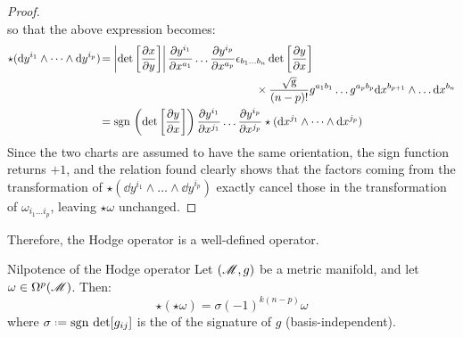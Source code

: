 \begin{proofbox}
\begin{proof}
\begin{equation}
      \label{eq:matrix-identity}
    \end{equation}
    so that the above expression becomes:
    \begin{equation*}
      \begin{split}
        \star (\mathrm{d} y^{i_1} \wedge \dots \wedge \mathrm{d} y^{i_p}) \hspace{-0.15em}
        & = \left\lvert\det \left[ \frac{\partial x}{\partial y} \right]\right\rvert \frac{\partial y^{i_1}}{\partial x^{a_1}} \dots \frac{\partial y^{i_p}}{\partial x^{a_p}} \epsilon_{b_1 \dots b_n} \det \left[ \frac{\partial y}{\partial x} \right] \\
        & \qquad \qquad \qquad \qquad \qquad \qquad \qquad \times \frac{\sqrt{\mathrm{g}}}{(n-p)!} g^{a_1 b_1} \dots g^{a_p b_p} \mathrm{d} x^{b_{p+1}} \wedge \dots \mathrm{d} x^{b_n} \\
        & = \mathrm{sgn}\,\left( \det \left[ \frac{\partial y}{\partial x} \right] \right) \frac{\partial y^{i_1}}{\partial x^{j_1}} \dots \frac{\partial y^{i_p}}{\partial x^{j_p}} \star (\mathrm{d} x^{j_1} \wedge \dots \wedge \mathrm{d} x^{j_p})
      \end{split}
    \end{equation*}
    Since the two charts are assumed to have the same orientation, the sign function returns $ +1 $, and the relation found clearly shows that the factors coming from the transformation of $ \star (\dd y^{i_1} \wedge \dots \wedge \dd y^{i_p}) $ exactly cancel those in the transformation of $ \omega_{i_1 \dots i_p} $, leaving $ \star \omega $ unchanged.
  \end{proof}
\end{proofbox}

Therefore, the Hodge operator is a well-defined operator.

\begin{lemma}{Nilpotence of the Hodge operator}{}
  Let $ (\mathscr{M},g) $ be a metric manifold, and let $ \omega \in \Omega^{p}(\mathscr{M}) $. Then:
  \begin{equation}
    \star (\star \omega) = \sigma (-1)^{k (n-p)} \omega
    \label{eq:hodge-nilpotence}
  \end{equation}
  where $ \sigma \defeq \sgn \det [g_{ij}] $ is the  of the signature of $ g $ (basis-independent).
\end{lemma}

